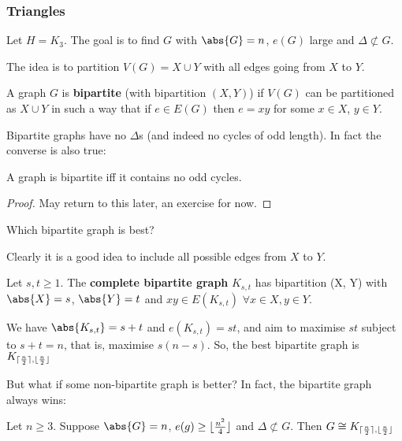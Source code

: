 \documentclass{article}
\DeclarePairedDelimiter\ceil{\lceil}{\rceil}
\DeclarePairedDelimiter\floor{\lfloor}{\rfloor}
\begin{document}
\subsubsection{Triangles}
Let $H = K_3$. The goal is to find $G$ with $\abs{G} = n$, $e(G)$ large and $\Delta \not\subset G$.

The idea is to partition $V(G) = X \cup Y$ with all edges going from $X$ to $Y$.

\begin{defi}
    A graph $G$ is \textbf{bipartite} (with bipartition $(X, Y)$) if $V(G)$ can be partitioned as $X \cup Y$ in such a way that if $e \in E(G)$ then $e = xy$ for some $x \in X$, $y \in Y$.
\end{defi}

Bipartite graphs have no $\Delta$s (and indeed no cycles of odd length). In fact the converse is also true:
\begin{nthm}\label{thm:7}
    A graph is bipartite iff it contains no odd cycles.
\end{nthm}

\begin{proof}
    May return to this later, an exercise for now.
\end{proof}

Which bipartite graph is best?

Clearly it is a good idea to include all possible edges from $X$ to $Y$.

\begin{defi}
    Let $s, t \geq 1$. The \textbf{complete bipartite graph} $K_{s, t}$ has bipartition (X, Y) with $\abs{X} = s$, $\abs{Y} = t$ and $xy \in E(K_{s, t})$ $\forall x \in X, y \in Y$.
\end{defi}

We have $\abs{K_{s, t}} = s + t$ and $e(K_{s, t}) = st$, and aim to maximise $st$ subject to $s + t = n$, that is, maximise $s(n-s)$.
So, the best bipartite graph is $K_{\ceil{\frac{n}{2}}, \floor{\frac{n}{2}}}$

But what if some non-bipartite graph is better?
In fact, the bipartite graph always wins:

\begin{nthm}
    Let $n \geq 3$. Suppose $\abs{G} = n$, $e(g) \geq \floor{\frac{n^2}{4}}$ and $\Delta \not\subset G$.
    Then $G \cong K_{\ceil{\frac{n}{2}}, \floor{\frac{n}{2}}}$
\end{nthm}
\end{document}
